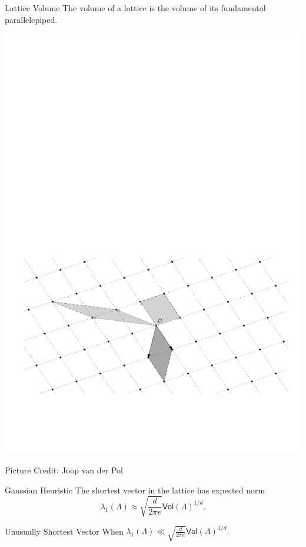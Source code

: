 \documentclass[xcolor=table,10pt,aspectratio=169]{beamer}
\begin{document}
\begin{frame}[label={sec:org782d688}]{Lattice Volume}
The volume of a lattice is the volume of its fundamental parallelepiped.

\begin{center}
\includegraphics[width=0.8\linewidth]{./joop-vol3.pdf}
\end{center}

\tiny Picture Credit: Joop van der Pol
\end{frame}

\begin{frame}[label={sec:orga6a0826}]{Gaussian Heuristic}
The shortest vector in the lattice has expected norm \[λ_1(Λ) ≈ \sqrt{\frac{d}{2 π e}} \mathsf{Vol}(\Lambda)^{1/d}.\]

\begin{block}{Unusually Shortest Vector}
When \(λ_1(Λ) \ll \sqrt{\frac{d}{2 π e}} \mathsf{Vol}(\Lambda)^{1/d}\).
\end{block}
\end{frame}
\end{document}
